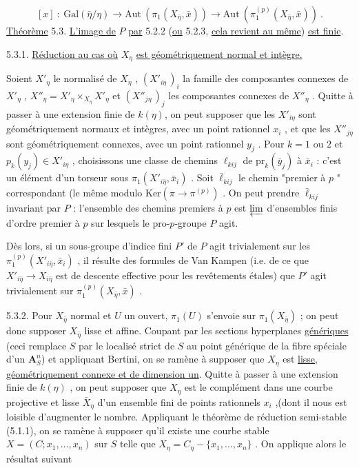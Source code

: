 
\begin{equation}\tag{5.2.3}
[x] \ : \ \mathrm{Gal}(\bar{\eta}/\eta) \longrightarrow \mathrm{Aut}\ (\pi_1(X_{\bar{\eta}},\bar{x})) \longrightarrow \mathrm{Aut}\ (\pi_1^{(p)}(X_{\bar{\eta}},\bar{x}))\ .
\end{equation}
\underline{Théorème} 5.3. \underline{L'image de} $P$ \underline{par} 5.2.2 (\underline{ou} 5.2.3, \underline{cela revient au même}) \underline{est finie}.


5.3.1. \underline{Réduction au cas où} $X_\eta$ \underline{est géométriquement normal et intègre.}

Soient $X'_\eta$ le normalisé de $X_\eta$ , $(X'_{i\eta}\,)_i$ la famille des composantes connexes de $X'_\eta$ , $X''_\eta = X'_\eta \times_{X_\eta} X'_\eta$ et $(X''_{j\eta}\,)_j$ les composantes connexes de $X''_\eta$ . Quitte à passer à une extension finie de $k(\eta)$, on peut supposer que les $X'_{i\eta}$ sont géométriquement normaux et intègres, avec un point rationnel $x_i$ , et que les $X''_{j\eta}$ sont géométriquement connexes, avec un point rationnel $y_j$ . Pour $k = 1$ ou $2$ et $p_k(y_j) \in X'_{i\eta}$ , choisissons une classe de chemins $\ell_{kij}$ de $\mathrm{pr}_k(\bar{y}_j)$ à $\bar{x}_i$ : c'est un élément d'un torseur sous $\pi_1(X'_{i\bar{\eta}},\bar{x}_i)$ . Soit $\bar{\ell}_{kij}$ le chemin "premier à $p$ " correspondant (le même modulo $\mathrm{Ker}(\pi \longrightarrow \pi^{(p)})$ . On peut prendre $\bar{\ell}_{kij}$ invariant par $P$ : l'ensemble des chemins premiers à $p$ est $\varprojlim$ d'ensembles finis d'ordre premier à $p$ sur lesquels le pro-$p$-groupe $P$ agit.

Dès lors, si un sous-groupe d'indice fini $P'$ de $P$ agit trivialement sur les $\pi_1^{(p)}(X'_{i\bar{\eta}},\bar{x}_i)$ , il résulte des formules de Van Kampen (i.e. de ce que $X'_{i\bar{\eta}} \longrightarrow X_{i\bar{\eta}}$ est de descente effective pour les revêtements étales) que $P'$ agit trivialement sur $\pi_1^{(p)}(X_{\bar{\eta}},\bar{x})$ .

5.3.2. Pour $X_{\bar{\eta}}$ normal et $U$ un ouvert, $\pi_1(U)$ s'envoie sur $\pi_1(X_{\bar{\eta}})$ ; on peut donc supposer $X_{\bar{\eta}}$ lisse et affine. Coupant par les sections hyperplanes \underline{génériques} (ceci remplace $S$ par le localisé strict de $S$ au point générique de la fibre spéciale d'un $\mathbf{A}^n_S$) et appliquant Bertini, on se ramène à supposer que $X_\eta$ est \underline{lisse, géométriquement connexe et de dimension un}. Quitte à passer à une extension finie de $k(\eta)$ , on peut supposer que $X_\eta$ est le complément dans une courbe projective et lisse $\bar{X}_\eta$ d'un ensemble fini de points rationnels $x_i$ ,(dont il nous est loisible d'augmenter le nombre. Appliquant le théorème de réduction semi-stable (5.1.1), on se ramène à supposer qu'il existe une courbe stable $X = (C ; x_1 ,\ldots, x_n)$ sur $S$ telle que $X_\eta = C_\eta - \{x_1 ,\ldots, x_n\}$ . On applique alors le résultat suivant


